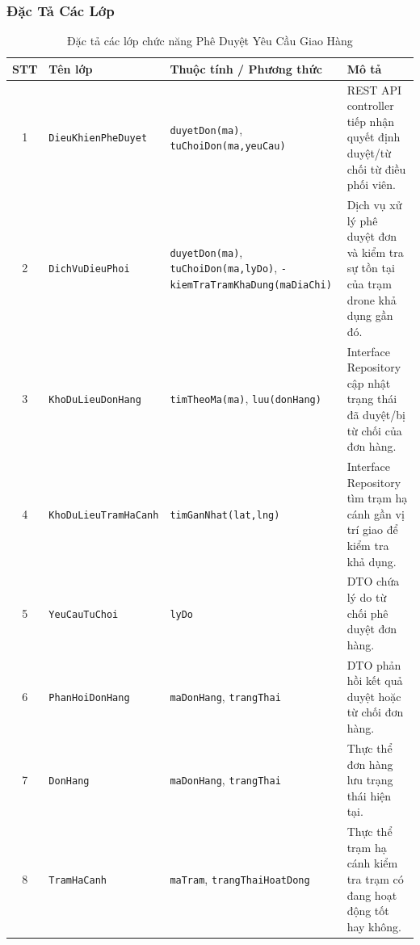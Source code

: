 \subsubsection{Đặc Tả Các Lớp}
\begin{table}[H]
  \centering
  \small
  \begin{tabularx}{\textwidth}{|c|>{\raggedright\arraybackslash}p{3.5cm}|>{\raggedright\arraybackslash}p{4.5cm}|>{\raggedright\arraybackslash}X|}
    \hline
    \textbf{STT} & \textbf{Tên lớp} & \textbf{Thuộc tính / Phương thức} & \textbf{Mô tả} \\
    \hline
    1 & \texttt{Dieu\allowbreak Khien\allowbreak Phe\allowbreak Duyet} & \texttt{duyet\allowbreak Don\allowbreak (ma)}, \texttt{tu\allowbreak Choi\allowbreak Don\allowbreak (ma,\allowbreak yeu\allowbreak Cau)} & REST API controller tiếp nhận quyết định duyệt/từ chối từ điều phối viên. \\ \hline
    2 & \texttt{Dich\allowbreak Vu\allowbreak Dieu\allowbreak Phoi} & \texttt{duyet\allowbreak Don\allowbreak (ma)}, \texttt{tu\allowbreak Choi\allowbreak Don\allowbreak (ma,\allowbreak ly\allowbreak Do)}, \texttt{- kiem\allowbreak Tra\allowbreak Tram\allowbreak Kha\allowbreak Dung\allowbreak (ma\allowbreak Dia\allowbreak Chi)} & Dịch vụ xử lý phê duyệt đơn và kiểm tra sự tồn tại của trạm drone khả dụng gần đó. \\ \hline
    3 & \texttt{Kho\allowbreak Du\allowbreak Lieu\allowbreak Don\allowbreak Hang} & \texttt{tim\allowbreak Theo\allowbreak Ma\allowbreak (ma)}, \texttt{luu\allowbreak (don\allowbreak Hang)} & Interface Repository cập nhật trạng thái đã duyệt/bị từ chối của đơn hàng. \\ \hline
    4 & \texttt{Kho\allowbreak Du\allowbreak Lieu\allowbreak Tram\allowbreak Ha\allowbreak Canh} & \texttt{tim\allowbreak Gan\allowbreak Nhat\allowbreak (lat,\allowbreak lng)} & Interface Repository tìm trạm hạ cánh gần vị trí giao để kiểm tra khả dụng. \\ \hline
    5 & \texttt{Yeu\allowbreak Cau\allowbreak Tu\allowbreak Choi} & \texttt{ly\allowbreak Do} & DTO chứa lý do từ chối phê duyệt đơn hàng. \\ \hline
    6 & \texttt{Phan\allowbreak Hoi\allowbreak Don\allowbreak Hang} & \texttt{ma\allowbreak Don\allowbreak Hang}, \texttt{trang\allowbreak Thai} & DTO phản hồi kết quả duyệt hoặc từ chối đơn hàng. \\ \hline
    7 & \texttt{Don\allowbreak Hang} & \texttt{ma\allowbreak Don\allowbreak Hang}, \texttt{trang\allowbreak Thai} & Thực thể đơn hàng lưu trạng thái hiện tại. \\ \hline
    8 & \texttt{Tram\allowbreak Ha\allowbreak Canh} & \texttt{ma\allowbreak Tram}, \texttt{trang\allowbreak Thai\allowbreak Hoat\allowbreak Dong} & Thực thể trạm hạ cánh kiểm tra trạm có đang hoạt động tốt hay không. \\
    \hline
  \end{tabularx}
  \caption{Đặc tả các lớp chức năng Phê Duyệt Yêu Cầu Giao Hàng}
  \label{tab:class-spec-uc04}
\end{table}

